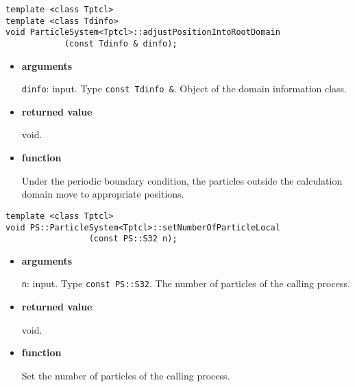 
\begin{screen}
\begin{verbatim}
template <class Tptcl>
template <class Tdinfo>
void ParticleSystem<Tptcl>::adjustPositionIntoRootDomain
            (const Tdinfo & dinfo);
\end{verbatim}
\end{screen}

\begin{itemize}

\item {\bf arguments}

{\tt dinfo}: input. Type {\tt const Tdinfo \&}. Object of the domain information class.
  

\item {\bf returned value}

void.

\item {\bf function}

Under the periodic boundary condition, the particles outside the
calculation domain move to appropriate positions.


\end{itemize}





\begin{screen}
\begin{verbatim}
template <class Tptcl>
void PS::ParticleSystem<Tptcl>::setNumberOfParticleLocal
                 (const PS::S32 n);
\end{verbatim}
\end{screen}

\begin{itemize}

\item {\bf arguments}

{\tt n}: input. Type {\tt const PS::S32}. The number of particles of the calling process.

\item {\bf returned value}

void.

\item {\bf function}

Set the number of particles of the calling  process.

\end{itemize}


